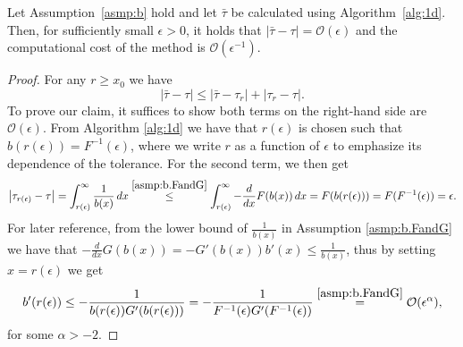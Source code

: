 \documentclass[a4paper, oneside, reqno]{amsart}
\newcommand{\abs}[1]{\left\lvert#1\right\rvert}
\theoremstyle{remark}
\begin{document}
\begin{theorem}
    \label{thm:error_alg1}
    Let Assumption~\ref{asmp:b} hold and let \(\bar\tau\) be calculated using Algorithm~\ref{alg:1d}.
    Then, for sufficiently small \(\epsilon > 0\), it holds that \(\abs{\bar\tau-\tau} = \mathcal{O}(\epsilon)\) and the computational cost of the method is \(\mathcal{O}\left(\epsilon^{-1}\right)\).
\end{theorem}
\begin{proof}
    For any \(r \geq x_0\) we have
    \begin{equation}
        \label{eq:errorSplit}
        \abs{\bar\tau-\tau} \leq \abs{\bar\tau-\tau_r} + \abs{\tau_r-\tau}.
    \end{equation}
    To prove our claim, it suffices to show both terms on the right-hand side are \(\mathcal{O}(\epsilon)\). 
    From Algorithm \ref{alg:1d} we have that \(r(\epsilon)\) is chosen such that \(b(r(\epsilon)) = F^{-1}(\epsilon)\), where we write \(r\) as a function of \(\epsilon\) to emphasize its dependence of the tolerance.
    For the second term, we then get
    \begin{equation}
        \label{eq:firstErrorTerm}
            \abs{\tau_{r(\epsilon)}-\tau} = \int_{r(\epsilon)}^\infty\frac{1}{b(x)}\,dx \stackrel{\ref{asmp:b.FandG}}{\leq} \int_{r(\epsilon)}^\infty-\frac{d}{dx}F(b(x)) \,dx = F(b(r(\epsilon)))=F(F^{-1}(\epsilon))=\epsilon.
    \end{equation}
    For later reference, from the lower bound of \(\frac{1}{b(x)}\) in Assumption \ref{asmp:b.FandG} we have that \(-\frac{d}{dx}G(b(x)) = -G'(b(x))b'(x) \leq \frac{1}{b(x)}\), thus by setting \(x = r(\epsilon)\) we get
    \begin{equation}
    \label{eq:boundB_der_r}
        b'(r(\epsilon)) \leq -\frac{1}{b(r(\epsilon))G'(b(r(\epsilon)))} = -\frac{1}{F^{-1}(\epsilon)G'(F^{-1}(\epsilon))} \stackrel{\ref{asmp:b.FandG}}{=} \mathcal{O}(\epsilon^\alpha),
    \end{equation}
    for some \(\alpha>-2\).


\end{proof}
\end{document}
